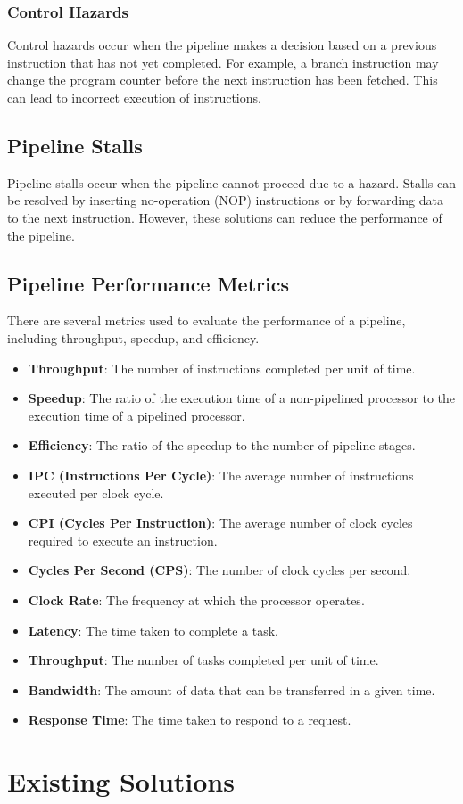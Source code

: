 \subsubsection {Control Hazards}
Control hazards occur when the pipeline makes a decision based on a previous instruction that has not yet completed. For example, a branch instruction may change the program counter before the next instruction has been fetched. This can lead to incorrect execution of instructions.\cite{pandey2016study}

\subsection {Pipeline Stalls}
Pipeline stalls occur when the pipeline cannot proceed due to a hazard. Stalls can be resolved by inserting no-operation (NOP) instructions or by forwarding data to the next instruction. However, these solutions can reduce the performance of the pipeline.\cite{pandey2016study}

\subsection {Pipeline Performance Metrics}
There are several metrics used to evaluate the performance of a pipeline, including throughput, speedup, and efficiency.

\begin{itemize}
    \item \textbf{Throughput}: The number of instructions completed per unit of time.
    \item \textbf{Speedup}: The ratio of the execution time of a non-pipelined processor to the execution time of a pipelined processor.
    \item \textbf{Efficiency}: The ratio of the speedup to the number of pipeline stages.
    \item \textbf{IPC (Instructions Per Cycle)}: The average number of instructions executed per clock cycle.
    \item \textbf{CPI (Cycles Per Instruction)}: The average number of clock cycles required to execute an instruction.
    \item \textbf{Cycles Per Second (CPS)}: The number of clock cycles per second.
    \item \textbf{Clock Rate}: The frequency at which the processor operates.
    \item \textbf{Latency}: The time taken to complete a task.
    \item \textbf{Throughput}: The number of tasks completed per unit of time.
    \item \textbf{Bandwidth}: The amount of data that can be transferred in a given time.
    \item \textbf{Response Time}: The time taken to respond to a request.
\end{itemize}\cite{pandey2016study}


\section {Existing Solutions}
















